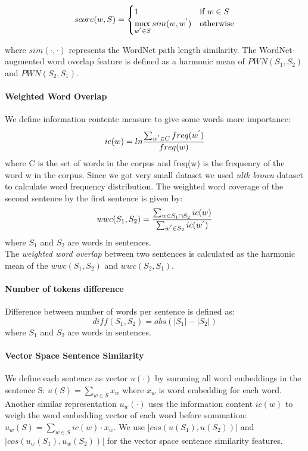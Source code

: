 \documentclass[10pt, a4paper]{article}
\begin{document}
\begin{table}[h!]
\begin{equation}\label{eq:pwn-score}
score(w, S) = \begin{cases}
1 & \text{if $w \in S $}\\
\max\limits_{w^{\rq} \in S} sim(w, w^{\rq}) & \text{otherwise}
\end{cases}
\end{equation}

where $sim(\cdot, \cdot)$ represents the WordNet path length
similarity. The WordNet-augmented word overlap
feature is defined as a harmonic mean of
$PWN(S_1, S_2)$ and $PWN(S_2, S_1)$.\citep{Saric2012TakeLabSF}


\paragraph{Weighted Word Overlap \\}
We define information contente measure to give some words more importance:
\begin{equation}\label{eq:inf-content}
ic(w) = ln \frac{\sum_{w^{\rq} \in C} freq(w^{\rq}) }{freq(w)}
\end{equation}
where C is the set of words in the corpus and
freq(w) is the frequency of the word w in the corpus. Since we got very small dataset we used \emph{nltk brown} dataset to calculate word frequency distribution.
The weighted word coverage of the second sentence by the first sentence is given by:
\begin{equation}\label{eq:wwc}
wwc(S_1, S_2) = \frac{\sum_{w \in S_1 \cap S_2} ic(w)}{\sum_{w^{\rq} \in S_2} ic(w^{\rq})}
\end{equation}
where $S_1$ and $S_2$ are words in sentences.\\
The \emph{weighted word overlap} between two sentences
is calculated as the harmonic mean of the
$wwc(S_1, S_2)$ and $wwc(S_2, S_1)$.\citep{Saric2012TakeLabSF}

\paragraph{Number of tokens difference \\}
Difference between number of words per sentence is defined as:
\begin{equation}\label{eq:word-diff}
diff(S_1, S_2) = abs(|S_1| - |S_2|)
\end{equation}
where $S_1$ and $S_2$ are words in sentences.
\paragraph{Vector Space Sentence Similarity \\}
We define each sentence as vector $u(\cdot)$ by summing all word embeddings in the sentence S: $ u(S) = \sum_{w \in S} x_w$ where $x_w$ is word embedding for each word. Another similar
representation $u_w(\cdot)$ uses the information content
$ic(w)$ to weigh the word embedding vector of each word
before summation: $u_w(S) = \sum_{w \in S} ic(w) \cdot x_w.$
We use $|cos(u(S_1), u(S_2))|$ and $|cos(u_w(S_1), u_w(S_2))|$ for the vector space sentence similarity features. \citep{Saric2012TakeLabSF}

\end{table}
\end{document}
